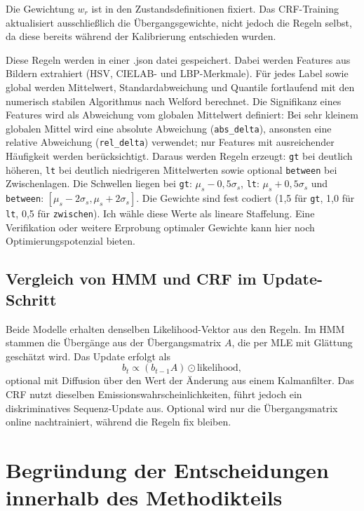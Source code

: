 Die Gewichtung $w_r$ ist in den Zustandsdefinitionen fixiert. Das CRF-Training aktualisiert ausschließlich die Übergangsgewichte, nicht jedoch die Regeln selbst, da diese bereits während der Kalibrierung entschieden wurden.

Diese Regeln werden in einer .json datei gespeichert. Dabei werden Features aus Bildern extrahiert (HSV, CIELAB- und LBP-Merkmale). Für jedes Label sowie global werden Mittelwert, Standardabweichung und Quantile fortlaufend mit den numerisch stabilen Algorithmus nach Welford \cite{welford1962note} berechnet. Die Signifikanz eines Features wird als Abweichung vom globalen Mittelwert definiert: Bei sehr kleinem globalen Mittel wird eine absolute Abweichung (\texttt{abs\_delta}), ansonsten eine relative Abweichung (\texttt{rel\_delta}) verwendet; nur Features mit ausreichender Häufigkeit werden berücksichtigt. Daraus werden Regeln erzeugt: \texttt{gt} bei deutlich höheren, \texttt{lt} bei deutlich niedrigeren Mittelwerten sowie optional \texttt{between} bei Zwischenlagen. Die Schwellen liegen bei \texttt{gt}: $\mu_s - 0{,}5\sigma_s$, \texttt{lt}: $\mu_s + 0{,}5\sigma_s$ und \texttt{between}: $[\mu_s - 2\sigma_s, \mu_s + 2\sigma_s]$. Die Gewichte sind fest codiert (1{,}5 für \texttt{gt}, 1{,}0 für \texttt{lt}, 0{,}5 für \texttt{zwischen}). Ich wähle diese Werte als lineare Staffelung. Eine Verifikation oder weitere Erprobung optimaler Gewichte kann hier noch Optimierungspotenzial bieten.

\subsection{Vergleich von HMM und CRF im Update-Schritt}
Beide Modelle erhalten denselben Likelihood-Vektor aus den Regeln. Im HMM stammen die Übergänge aus der Übergangsmatrix $A$, die per MLE mit Glättung geschätzt wird. Das Update erfolgt als
\[
    b_t \propto (b_{t-1} A) \odot \text{likelihood},
\]
optional mit Diffusion über den Wert der Änderung aus einem Kalmanfilter. Das CRF nutzt dieselben Emissionswahrscheinlichkeiten, führt jedoch ein diskriminatives Sequenz-Update aus. Optional wird nur die Übergangsmatrix online nachtrainiert, während die Regeln fix bleiben.

\section{Begründung der Entscheidungen innerhalb des Methodikteils}

